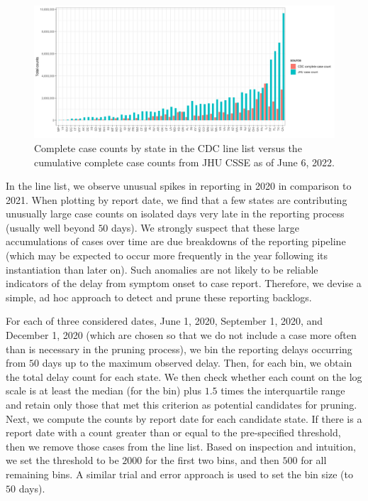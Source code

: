\documentclass{article}
\begin{document}
\begin{figure}[!tb]
\centering
    \includegraphics[width=1.20\textwidth]{prop_cc_cdc_vs_jhu.pdf} 
    \caption{Complete case counts by state in the CDC line list versus the 
    cumulative complete case counts from JHU CSSE as of June 6, 2022.}
    \label{fig:prop_cc_cdc_vs_jhu}
\end{figure}

In the line list, we observe unusual spikes in reporting in 2020 in comparison
to 2021. When plotting by report date, we find that a few states are
contributing unusually large case counts on isolated days very late in the
reporting process (usually well beyond $50$ days). We strongly suspect that
these large accumulations of cases over time are due breakdowns of the reporting
pipeline (which may be expected to occur more frequently in the year following
its instantiation than later on). Such anomalies are not likely to be reliable
indicators of the delay from symptom onset to case report. Therefore, we devise
a simple, ad hoc approach to detect and prune these reporting backlogs. 

For each of three considered dates, June 1, 2020, September 1, 2020, and
December 1, 2020 (which are chosen so that we do not include a case more often
than is necessary in the pruning process), we bin the reporting delays occurring
from $50$ days up to the maximum observed delay. Then, for each bin, we obtain
the total delay count for each state. We then check whether each count on the
log scale is at least the median (for the bin) plus $1.5$ times the
interquartile range and retain only those that met this criterion as potential
candidates for pruning. Next, we compute the counts by report date for each
candidate state. If there is a report date with a count greater than or equal to
the pre-specified threshold, then we remove those cases from the line list.
Based on inspection and intuition, we set the threshold to be $2000$ for the
first two bins, and then $500$ for all remaining bins. A similar trial and error
approach is used to set the bin size (to $50$ days). %
\end{document}
